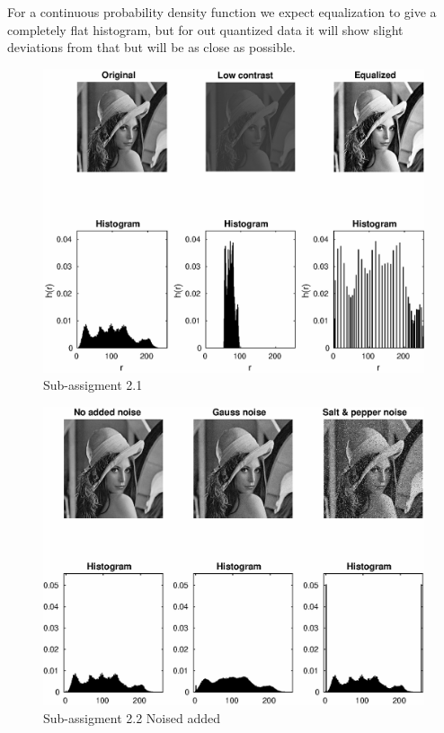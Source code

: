 \documentclass[a4paper]{article}
\begin{document}
For a continuous probability density function we expect equalization to give a completely flat histogram, but for out quantized data it will show slight deviations from that but will be as close as possible.

\begin{figure}[!ht]
  \centering
  \includegraphics[width=0.9\columnwidth]{images/2-1.eps}
  \caption{Sub-assigment 2.1}
  \label{fig:21}
\end{figure}

\begin{figure}[!ht]
  \centering
  \includegraphics[width=0.9\columnwidth]{images/2-2_noised.eps}
  \caption{Sub-assigment 2.2 Noised added}
  \label{fig:22n}
\end{figure}
\end{document}
